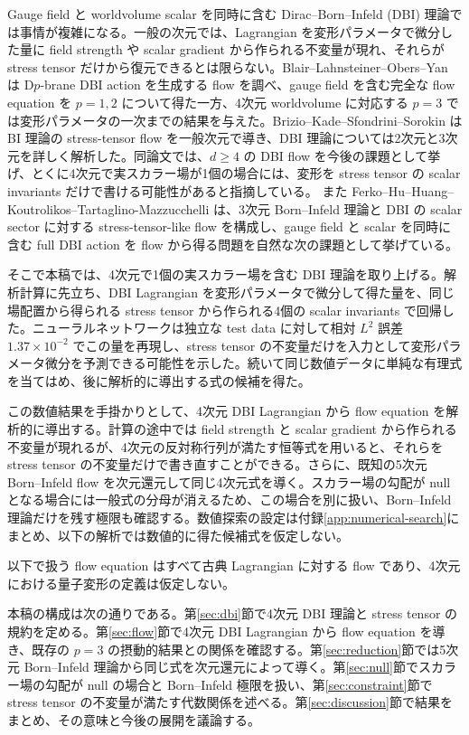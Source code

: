 \documentclass[a4paper,11pt]{ltjsarticle}
\numberwithin{equation}{section}
\begin{document}
Gauge field と worldvolume scalar を同時に含む Dirac--Born--Infeld (DBI) 理論では事情が複雑になる。一般の次元では、Lagrangian を変形パラメータで微分した量に field strength や scalar gradient から作られる不変量が現れ、それらが stress tensor だけから復元できるとは限らない。Blair--Lahnsteiner--Obers--Yan は D$p$-brane DBI action を生成する flow を調べ、gauge field を含む完全な flow equation を $p=1,2$ について得た一方、4次元 worldvolume に対応する $p=3$ では変形パラメータの一次までの結果を与えた\cite{Blair2025}。Brizio--Kade--Sfondrini--Sorokin は BI 理論の stress-tensor flow を一般次元で導き、DBI 理論については2次元と3次元を詳しく解析した\cite{Brizio2026}。同論文では、$d\geq4$ の DBI flow を今後の課題として挙げ、とくに4次元で実スカラー場が1個の場合には、変形を stress tensor の scalar invariants だけで書ける可能性があると指摘している。 また Ferko--Hu--Huang--Koutrolikos--Tartaglino-Mazzucchelli は、3次元 Born--Infeld 理論と DBI の scalar sector に対する stress-tensor-like flow を構成し、gauge field と scalar を同時に含む full DBI action を flow から得る問題を自然な次の課題として挙げている\cite{Ferko2024DBI}。

そこで本稿では、4次元で1個の実スカラー場を含む DBI 理論を取り上げる。解析計算に先立ち、DBI Lagrangian を変形パラメータで微分して得た量を、同じ場配置から得られる stress tensor から作られる4個の scalar invariants で回帰した。ニューラルネットワークは独立な test data に対して相対 $L^2$ 誤差 $1.37\times10^{-2}$ でこの量を再現し、stress tensor の不変量だけを入力として変形パラメータ微分を予測できる可能性を示した。続いて同じ数値データに単純な有理式を当てはめ、後に解析的に導出する式の候補を得た。

この数値結果を手掛かりとして、4次元 DBI Lagrangian から flow equation を解析的に導出する。計算の途中では field strength と scalar gradient から作られる不変量が現れるが、4次元の反対称行列が満たす恒等式を用いると、それらを stress tensor の不変量だけで書き直すことができる。さらに、既知の5次元 Born--Infeld flow を次元還元して同じ4次元式を導く。スカラー場の勾配が null となる場合には一般式の分母が消えるため、この場合を別に扱い、Born--Infeld 理論だけを残す極限も確認する。数値探索の設定は付録\ref{app:numerical-search}にまとめ、以下の解析では数値的に得た候補式を仮定しない。

以下で扱う flow equation はすべて古典 Lagrangian に対する flow であり、4次元における量子変形の定義は仮定しない。

本稿の構成は次の通りである。第\ref{sec:dbi}節で4次元 DBI 理論と stress tensor の規約を定める。第\ref{sec:flow}節で4次元 DBI Lagrangian から flow equation を導き、既存の $p=3$ の摂動的結果との関係を確認する。第\ref{sec:reduction}節では5次元 Born--Infeld 理論から同じ式を次元還元によって導く。第\ref{sec:null}節でスカラー場の勾配が null の場合と Born--Infeld 極限を扱い、第\ref{sec:constraint}節で stress tensor の不変量が満たす代数関係を述べる。第\ref{sec:discussion}節で結果をまとめ、その意味と今後の展開を議論する。
\end{document}
